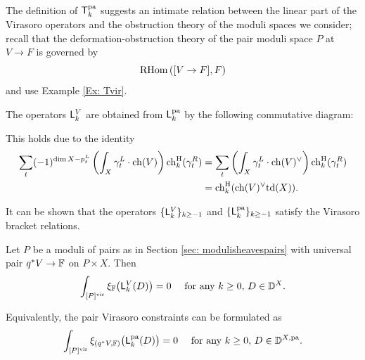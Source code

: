 \documentclass[a4paper, 12pt]{amsart}
\begin{document}
The definition of ${\mathsf{T}}_k^{\mathop{\rm pa}\nolimits}$ suggests an intimate relation between the linear part of the Virasoro operators and the obstruction theory of the moduli spaces we consider; recall that the deformation-obstruction theory of the pair moduli space $P$ at $V\to F$ is governed by
\[\mathrm{RHom}\left([V\to F], F\right)\]
and use Example \ref{Ex: Tvir}.

The operators ${\mathsf{L}}_k^V$ are obtained from ${\mathsf{L}}_k^{\mathop{\rm pa}\nolimits}$ by the following commutative diagram:
\begin{center}
\end{center}
This holds due to the identity
\begin{align*}
\sum_{t}(-1)^{\dim X-p_t^L}\left(\int_X \gamma_t^L \cdot \mathrm{ch}(V) \right)\mathrm{ch}^{\mathrm{H}}_k(\gamma_t^R)&=\sum_t \left(\int_X \gamma_t^L \cdot \mathrm{ch}(V)^\vee \right)\mathrm{ch}^{\mathrm{H}}_k(\gamma_t^R)\\
&=\mathrm{ch}^{\mathrm{H}}_k(\mathrm{ch}(V)^\vee \mathrm{td}(X)).
\end{align*}



It can be shown that the operators $\{{\mathsf{L}}_k^V\}_{k\geq -1}$ and $\{{\mathsf{L}}_k^{\mathop{\rm pa}\nolimits}\}_{k\geq -1}$ satisfy the Virasoro bracket relations.

\begin{conjecture}\label{conj: pairvirasoro}
Let $P$ be a moduli of pairs as in Section \ref{sec: modulisheavespairs} with universal pair $q^\ast V\to {\mathbb{F}}$ on $P\times X$. Then
\[\int_{[P]^{\mathrm{vir}}}\xi_{\mathbb{F}}\big({\mathsf{L}}_k^V(D)\big)=0\quad \textup{ for any }k\geq 0, \, D\in {\mathbb{D}}^X.\]
\end{conjecture}
Equivalently, the pair Virasoro constraints can be formulated as
\[\int_{[P]^{\mathrm{vir}}} \xi_{(q^\ast V,{\mathbb{F}})}\big({\mathsf{L}}_k^{\mathop{\rm pa}\nolimits}(D)\big)=0\quad \textup{ for any }k\geq 0, \, D\in {\mathbb{D}}^{X, \mathop{\rm pa}\nolimits}.\]
\end{document}
